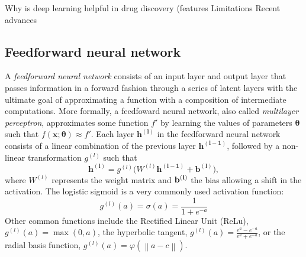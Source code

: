 \documentclass[bsc,frontabs,twoside,singlespacing,parskip,deptreport]{infthesis}     %
\begin{document}
Why is deep learning helpful in drug discovery (features
Limitations
Recent advances
\subsection{Feedforward neural network}
A \textit{feedforward neural network} consists of an input layer and output layer that passes information in a forward fashion through a series of latent layers with the ultimate goal of approximating a function with a composition of intermediate computations. More formally, a feedfoward neural network, also called \textit{multilayer perceptron}, approximates some function \(f'\) by learning the values of parameters \(\boldsymbol{\theta}\) such that \(f(\boldsymbol{x} ; \boldsymbol{\theta}) \approx f'\).
Each layer \(\bm{h^{(l)}}\)  in the feedforward neural network consists of a linear combination of the previous layer \(\bm{h^{(l-1)}}\), followed by a non-linear transformation \(g^{(l)}\) such that \[\bm{h^{(l)}} = g^{(l)}(W^{(l)}\bm{h^{(l-1)}} + \bm{b^{(l)})},\]
where \(W^{(l)}\) represents the weight matrix and \(\bf{b^{(l)}}\) the bias allowing a shift in the activation. The logistic sigmoid is a very commonly used activation function: \[g^{(l)}(a) = \sigma(a) = \frac{1}{1+e^{-a}}\]
Other common functions include the Rectified Linear Unit (ReLu), \(g^{(l)}(a)= \max(0, a)\), the hyperbolic tangent, \(g^{(l)}(a)={\frac {e^{a}-e^{-a}}{e^{a}+e^{-a}}}\), or the radial basis function, \(g^{(l)}(a)=\varphi (\left\|a -c \right\|)\).
\end{document}
